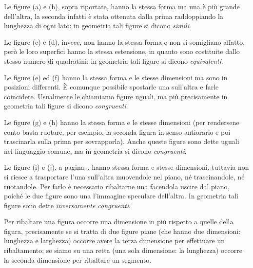 \begin{figure}[htb]
\centering\qquad\qquad

\end{figure}

Le figure (a) e (b), sopra riportate, hanno la stessa forma ma una è più grande dell'altra, la seconda infatti è stata ottenuta dalla prima raddoppiando la lunghezza di ogni lato: in geometria tali figure si dicono \emph{simili}.

Le figure (c) e (d), invece, non hanno la stessa forma e non si somigliano affatto, però le loro superfici hanno la stessa estensione, in quanto sono costituite dallo stesso numero di quadratini: in geometria tali figure si dicono \emph{equivalenti}.

\begin{figure}[htb]
\centering\qquad\qquad

\end{figure}

Le figure (e) ed (f) hanno la stessa forma e le stesse dimensioni ma sono in posizioni differenti. \`E comunque possibile spostarle una sull'altra e farle coincidere. Usualmente le chiamiamo figure uguali, ma più precisamente in geometria tali figure si dicono \emph{congruenti}.

Le figure (g) e (h) hanno la stessa forma e le stesse dimensioni (per rendersene conto basta ruotare, per esempio, la seconda figura in senso antiorario e poi trascinarla sulla prima per sovrapporla). Anche queste figure sono dette uguali nel linguaggio comune, ma in geometria si dicono \emph{congruenti}.

Le figure (i) e (j), a pagina~\pageref{fig:figure_i_j}, hanno stessa forma e stesse dimensioni, tuttavia non si riesce a trasportare l'una sull'altra muovendole nel piano, né trascinandole, né ruotandole. Per farlo è necessario ribaltarne una facendola uscire dal piano, poiché le due figure sono una l'immagine speculare dell'altra. In geometria tali figure sono dette \emph{inversamente congruenti}.

\begin{figure}[htb]
\centering\label{fig:figure_i_j}
\end{figure}

\osservazione Per ribaltare una figura occorre una dimensione in più rispetto a quelle della figura, precisamente se si tratta di due figure piane (che hanno due dimensioni: lunghezza e larghezza)  occorre avere la terza dimensione per effettuare un ribaltamento; se siamo su una retta (una sola dimensione: la lunghezza) occorre la seconda dimensione per ribaltare un segmento.

